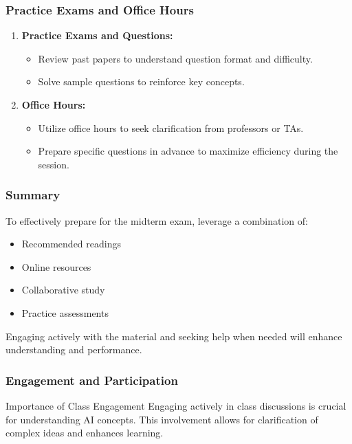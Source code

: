 \documentclass[aspectratio=169]{beamer}
\begin{document}
\begin{frame}[fragile]
    \frametitle{Practice Exams and Office Hours}
    \begin{enumerate}
        \item \textbf{Practice Exams and Questions:}
            \begin{itemize}
                \item Review past papers to understand question format and difficulty. 
                \item Solve sample questions to reinforce key concepts.
            \end{itemize}

        \item \textbf{Office Hours:}
            \begin{itemize}
                \item Utilize office hours to seek clarification from professors or TAs.
                \item Prepare specific questions in advance to maximize efficiency during the session.
            \end{itemize}
    \end{enumerate}
\end{frame}

\begin{frame}[fragile]
    \frametitle{Summary}
    To effectively prepare for the midterm exam, leverage a combination of:
    \begin{itemize}
        \item Recommended readings
        \item Online resources
        \item Collaborative study
        \item Practice assessments
    \end{itemize}
    Engaging actively with the material and seeking help when needed will enhance understanding and performance.
\end{frame}

\begin{frame}[fragile]
    \frametitle{Engagement and Participation}
    \begin{block}{Importance of Class Engagement}
        Engaging actively in class discussions is crucial for understanding AI concepts. This involvement allows for clarification of complex ideas and enhances learning.
    \end{block}
\end{frame}
\end{document}
